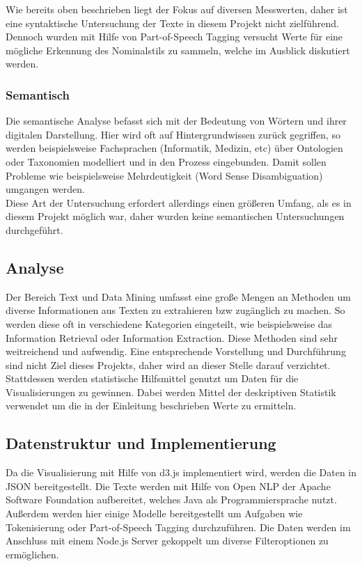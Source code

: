 Wie bereits oben beschrieben liegt der Fokus auf diversen Messwerten, daher ist eine syntaktische Untersuchung der Texte in diesem Projekt nicht zielführend. Dennoch wurden mit Hilfe von Part-of-Speech Tagging versucht Werte für eine mögliche Erkennung des Nominalstils zu sammeln, welche im Ausblick diskutiert werden.

\subsubsection{Semantisch}
Die semantische Analyse befasst sich mit der Bedeutung von Wörtern und ihrer digitalen Darstellung. Hier wird oft auf Hintergrundwissen zurück gegriffen, so werden beispielsweise Fachsprachen (Informatik, Medizin, etc) über Ontologien oder Taxonomien modelliert und in den Prozess eingebunden. Damit sollen Probleme wie beispielsweise Mehrdeutigkeit (Word Sense Disambiguation) umgangen werden. \\

Diese Art der Untersuchung erfordert allerdings einen größeren Umfang, als es in diesem Projekt möglich war, daher wurden keine semantischen Untersuchungen durchgeführt.

\subsection{Analyse}
Der Bereich Text und Data Mining umfasst eine große Mengen an Methoden um diverse Informationen aus Texten zu extrahieren bzw zugänglich zu machen. So werden diese oft in verschiedene Kategorien eingeteilt, wie beispielsweise das Information Retrieval oder Information Extraction. Diese Methoden sind sehr weitreichend und aufwendig. Eine entsprechende Vorstellung und Durchführung sind nicht Ziel dieses Projekts, daher wird an dieser Stelle darauf verzichtet.\\

Stattdessen werden statistische Hilfsmittel genutzt um Daten für die Visualisierungen zu gewinnen. Dabei werden Mittel der deskriptiven Statistik verwendet um die in der Einleitung beschrieben Werte zu ermitteln.

\subsection{Datenstruktur und Implementierung}
Da die Visualisierung mit Hilfe von d3.js implementiert wird, werden die Daten in JSON bereitgestellt. Die Texte werden mit Hilfe von Open NLP der Apache Software Foundation aufbereitet, welches Java als Programmiersprache nutzt. Außerdem werden hier einige Modelle bereitgestellt um Aufgaben wie Tokenisierung oder Part-of-Speech Tagging durchzuführen. Die Daten werden im Anschluss mit einem Node.js Server gekoppelt um diverse Filteroptionen zu ermöglichen.

